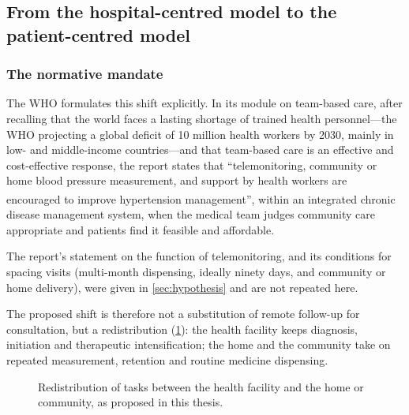 \documentclass[12pt,a4paper,oneside]{report}
\newcommand{\bq}[1]{``#1''\textsuperscript{\dag}}
\begin{document}
\subsection{From the hospital-centred model to the patient-centred model}\label{sec:patient-centred}

\subsubsection{The normative mandate}

The WHO formulates this shift explicitly. In its module on team-based care, after recalling that the world faces a lasting shortage of trained health personnel---the WHO projecting a global deficit of 10 million health workers by 2030, mainly in low- and middle-income countries---and that team-based care is an effective and cost-effective response, the report states that \bq{telemonitoring, community or home blood pressure measurement, and support by health workers are encouraged to improve hypertension management}, within an integrated chronic disease management system, when the medical team judges community care appropriate and patients find it feasible and affordable.

The report's statement on the function of telemonitoring, and its conditions for spacing visits (multi-month dispensing, ideally ninety days, and community or home delivery), were given in \cref{sec:hypothesis} and are not repeated here.

The proposed shift is therefore not a substitution of remote follow-up for consultation, but a redistribution (\cref{fig:redistribution}): the health facility keeps diagnosis, initiation and therapeutic intensification; the home and the community take on repeated measurement, retention and routine medicine dispensing.

\begin{figure}[htbp]
\centering
{}
\caption{Redistribution of tasks between the health facility and the home or community, as proposed in this thesis.}\label{fig:redistribution}
\end{figure}
\end{document}
